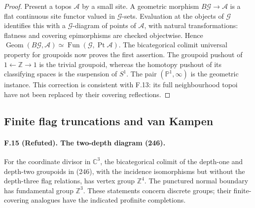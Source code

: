 \begin{proof}
Present a topos $\mathcal A$ by a small site. A geometric morphism
$B\mathcal G\to\mathcal A$ is a flat continuous site functor valued in
$\mathcal G$-sets. Evaluation at the objects of $\mathcal G$ identifies
this with a $\mathcal G$-diagram of points of $\mathcal A$, with natural
transformations: flatness and covering epimorphisms are checked
objectwise. Hence
$\operatorname{Geom}(B\mathcal G,\mathcal A)
\simeq\operatorname{Fun}(\mathcal G,\operatorname{Pt}\mathcal A)$.
The bicategorical colimit universal property for groupoids now proves
the first assertion. The groupoid pushout of $1\leftarrow\mathbb Z\to1$
is the trivial groupoid, whereas the homotopy pushout of its classifying
spaces is the suspension of $S^1$. The pair $(\mathbb P^1,\infty)$ is the
geometric instance. This correction is consistent with F.13: its full
neighbourhood topoi have not been replaced by their covering reflections.
\end{proof}

\subsection{Finite flag truncations and van Kampen}

\paragraph{F.15 (Refuted). The two-depth diagram (246).}
For the coordinate divisor in $\mathbb C^3$, the bicategorical colimit
of the depth-one and depth-two groupoids in (246), with the incidence
isomorphisms but without the depth-three flag relations, has vertex
group $\mathbb Z^4$. The punctured normal boundary has fundamental
group $\mathbb Z^3$. These statements concern discrete groups; their
finite-covering analogues have the indicated profinite completions.

